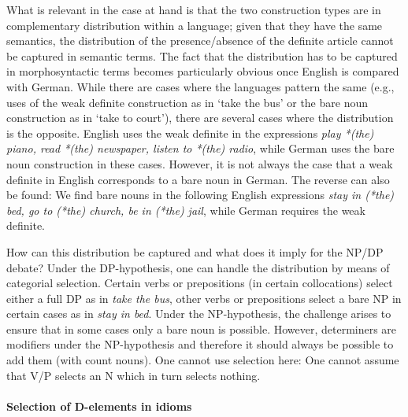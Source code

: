 \documentclass[output=paper,colorlinks,citecolor=black,
]{langscibook}
\begin{document}
\ea 
{}
    \z
    \z    
        
What is relevant in the case at hand is that the two construction types are in complementary distribution within a language; given that they have the same semantics, the distribution of the presence/absence of the definite article cannot be captured in semantic terms. The fact that the distribution has to be captured in morphosyntactic terms becomes particularly obvious once English is compared with German. While there are cases where the languages pattern the same (e.g., uses of the weak definite construction as in `take the bus' or the bare noun construction as in `take to court'), there are several cases where the distribution is the opposite. English uses the weak definite in the expressions \textit{play *(the) piano, read *(the) newspaper, listen to *(the) radio}, while German uses the bare noun construction in these cases. However, it is not always the case that a weak definite in English corresponds to a bare noun in German. The reverse can also be found: We find bare nouns in the following English expressions \textit{stay in (*the) bed, go to (*the) church, be in (*the) jail}, while German requires the weak definite.

How can this distribution be captured and what does it imply for the NP/DP debate? Under the DP-hypothesis, one can handle the distribution by means of categorial selection. Certain verbs or prepositions (in certain collocations) select either a  full DP as in \textit{take the bus}, other verbs or prepositions select a bare NP in certain cases as in \textit{stay in bed}. Under the NP-hypothesis, the challenge arises to ensure that in some cases only a bare noun is possible. However, determiners are modifiers under the NP-hypothesis and therefore it should always be possible to add them (with count nouns). One cannot use selection here: One cannot assume that V/P selects an N which in turn selects nothing. 

 \paragraph{Selection of D-elements in idioms}
 
\end{document}
